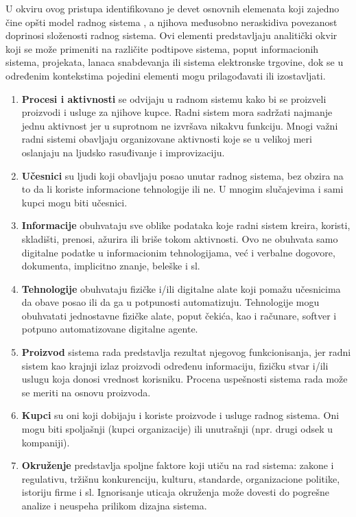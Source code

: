 U okviru ovog pristupa identifikovano je devet osnovnih elemenata koji zajedno čine opšti model radnog sistema \cite{alter2013work}, a njihova međusobno neraskidiva povezanost doprinosi složenosti radnog sistema. Ovi elementi predstavljaju analitički okvir koji se može primeniti na različite podtipove sistema, poput informacionih sistema, projekata, lanaca snabdevanja ili sistema elektronske trgovine, dok se u određenim kontekstima pojedini elementi mogu prilagođavati ili izostavljati.

\begin{enumerate}
\item \textbf{Procesi i aktivnosti} se odvijaju u radnom sistemu kako bi se proizveli proizvodi i usluge za njihove kupce. Radni sistem mora sadržati najmanje jednu aktivnost jer u suprotnom ne izvršava nikakvu funkciju. Mnogi važni radni sistemi obavljaju organizovane aktivnosti koje se u velikoj meri oslanjaju na ljudsko rasuđivanje i improvizaciju.
\item \textbf{Učesnici} su ljudi koji obavljaju posao unutar radnog sistema, bez obzira na to da li koriste informacione tehnologije ili ne. U mnogim slučajevima i sami kupci mogu biti učesnici.
\item \textbf{Informacije} obuhvataju sve oblike podataka koje radni sistem kreira, koristi, skladišti, prenosi, ažurira ili briše tokom aktivnosti. Ovo ne obuhvata samo digitalne podatke u informacionim tehnologijama, već i verbalne dogovore, dokumenta, implicitno znanje, beleške i sl.
\item \textbf{Tehnologije} obuhvataju fizičke i/ili digitalne alate koji pomažu učesnicima da obave posao ili da ga u potpunosti automatizuju. Tehnologije mogu obuhvatati jednostavne fizičke alate, poput čekića, kao i računare, softver i potpuno automatizovane digitalne agente.
\item \textbf{Proizvod} sistema rada predstavlja rezultat njegovog funkcionisanja, jer radni sistem kao krajnji izlaz proizvodi određenu informaciju, fizičku stvar i/ili uslugu koja donosi vrednost korisniku. Procena uspešnosti sistema rada može se meriti na osnovu proizvoda.
\item \textbf{Kupci} su oni koji dobijaju i koriste proizvode i usluge radnog sistema. Oni mogu biti spoljašnji (kupci organizacije) ili unutrašnji (npr. drugi odsek u kompaniji).
\item \textbf{Okruženje} predstavlja spoljne faktore koji utiču na rad sistema: zakone i regulativu, tržišnu konkurenciju, kulturu, standarde, organizacione politike, istoriju firme i sl. Ignorisanje uticaja okruženja može dovesti do pogrešne analize i neuspeha prilikom dizajna sistema.

\end{enumerate}

